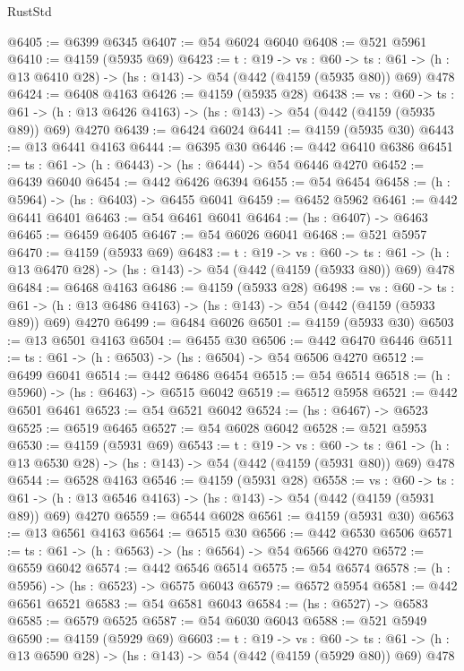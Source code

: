 \begin{lexlean}{RustStd}
\begin{coremodule}
@6405 := @6399 @6345
@6407 := @54 @6024 @6040
@6408 := @521 @5961
@6410 := @4159 (@5935 @69)
@6423 := {t : @19} ->
  {vs : @60} ->
  {ts : @61} -> (h : @13 @6410 @28) -> (hs : @143) -> @54 (@442 (@4159 (@5935 @80)) @69) @478
@6424 := @6408 @4163
@6426 := @4159 (@5935 @28)
@6438 := {vs : @60} ->
  {ts : @61} -> (h : @13 @6426 @4163) -> (hs : @143) -> @54 (@442 (@4159 (@5935 @89)) @69) @4270
@6439 := @6424 @6024
@6441 := @4159 (@5935 @30)
@6443 := @13 @6441 @4163
@6444 := @6395 @30
@6446 := @442 @6410 @6386
@6451 := {ts : @61} -> (h : @6443) -> (hs : @6444) -> @54 @6446 @4270
@6452 := @6439 @6040
@6454 := @442 @6426 @6394
@6455 := @54 @6454
@6458 := (h : @5964) -> (hs : @6403) -> @6455 @6041
@6459 := @6452 @5962
@6461 := @442 @6441 @6401
@6463 := @54 @6461 @6041
@6464 := (hs : @6407) -> @6463
@6465 := @6459 @6405
@6467 := @54 @6026 @6041
@6468 := @521 @5957
@6470 := @4159 (@5933 @69)
@6483 := {t : @19} ->
  {vs : @60} ->
  {ts : @61} -> (h : @13 @6470 @28) -> (hs : @143) -> @54 (@442 (@4159 (@5933 @80)) @69) @478
@6484 := @6468 @4163
@6486 := @4159 (@5933 @28)
@6498 := {vs : @60} ->
  {ts : @61} -> (h : @13 @6486 @4163) -> (hs : @143) -> @54 (@442 (@4159 (@5933 @89)) @69) @4270
@6499 := @6484 @6026
@6501 := @4159 (@5933 @30)
@6503 := @13 @6501 @4163
@6504 := @6455 @30
@6506 := @442 @6470 @6446
@6511 := {ts : @61} -> (h : @6503) -> (hs : @6504) -> @54 @6506 @4270
@6512 := @6499 @6041
@6514 := @442 @6486 @6454
@6515 := @54 @6514
@6518 := (h : @5960) -> (hs : @6463) -> @6515 @6042
@6519 := @6512 @5958
@6521 := @442 @6501 @6461
@6523 := @54 @6521 @6042
@6524 := (hs : @6467) -> @6523
@6525 := @6519 @6465
@6527 := @54 @6028 @6042
@6528 := @521 @5953
@6530 := @4159 (@5931 @69)
@6543 := {t : @19} ->
  {vs : @60} ->
  {ts : @61} -> (h : @13 @6530 @28) -> (hs : @143) -> @54 (@442 (@4159 (@5931 @80)) @69) @478
@6544 := @6528 @4163
@6546 := @4159 (@5931 @28)
@6558 := {vs : @60} ->
  {ts : @61} -> (h : @13 @6546 @4163) -> (hs : @143) -> @54 (@442 (@4159 (@5931 @89)) @69) @4270
@6559 := @6544 @6028
@6561 := @4159 (@5931 @30)
@6563 := @13 @6561 @4163
@6564 := @6515 @30
@6566 := @442 @6530 @6506
@6571 := {ts : @61} -> (h : @6563) -> (hs : @6564) -> @54 @6566 @4270
@6572 := @6559 @6042
@6574 := @442 @6546 @6514
@6575 := @54 @6574
@6578 := (h : @5956) -> (hs : @6523) -> @6575 @6043
@6579 := @6572 @5954
@6581 := @442 @6561 @6521
@6583 := @54 @6581 @6043
@6584 := (hs : @6527) -> @6583
@6585 := @6579 @6525
@6587 := @54 @6030 @6043
@6588 := @521 @5949
@6590 := @4159 (@5929 @69)
@6603 := {t : @19} ->
  {vs : @60} ->
  {ts : @61} -> (h : @13 @6590 @28) -> (hs : @143) -> @54 (@442 (@4159 (@5929 @80)) @69) @478

\end{coremodule}
\end{lexlean}
